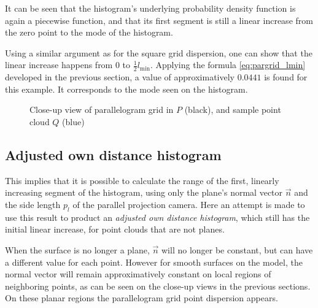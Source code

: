 It can be seen that the histogram's underlying probability density function is again a piecewise function, and that its first segment is still a linear increase from the zero point to the mode of the histogram.

Using a similar argument as for the square grid dispersion, one can show that the linear increase happens from $0$ to $\frac{1}{2} l_\text{min}$. Applying the formula \ref{eq:pargrid_lmin} developed in the previous section, a value of approximatively $0.0441$ is found for this example. It corresponds to the mode seen on the histogram.

\begin{figure}[p]
\centering
{
	\setlength{\fboxsep}{0pt}%
	\setlength{\fboxrule}{0.5pt}%
}
\caption{Close-up view of parallelogram grid in $P$ (black), and sample point cloud $Q$ (blue)}
\label{fig:par_grid}
\end{figure}


\subsection{Adjusted own distance histogram}
This implies that it is possible to calculate the range of the first, linearly increasing segment of the histogram, using only the plane's normal vector $\vec{n}$ and the side length $p_l$ of the parallel projection camera. Here an attempt is made to use this result to product an \emph{adjusted own distance histogram}, which still has the initial linear increase, for point clouds that are not planes.

When the surface is no longer a plane, $\vec{n}$ will no longer be constant, but can have a different value for each point. However for smooth surfaces on the model, the normal vector will remain approximatively constant on local regions of neighboring points, as can be seen on the close-up views in the previous sections. On these planar regions the parallelogram grid point dispersion appears.

